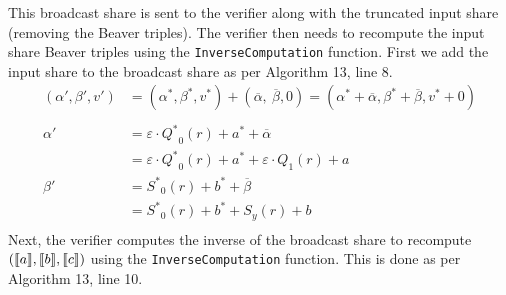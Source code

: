 \documentclass[11pt]{report}
\theoremstyle{definition}
\theoremstyle{plain}
\begin{document}
This broadcast share is sent to the verifier along with the truncated input share (removing the Beaver triples). The verifier then needs to recompute the input share Beaver triples using the \texttt{InverseComputation} function. First we add the input share to the broadcast share as per Algorithm 13, line 8.
\begin{align*}
  (\alpha', \beta', v') & = (\alpha^*, \beta^*, v^*) + (\overline{\alpha},\ \overline{\beta}, 0)
  = (\alpha^* + \overline{\alpha}, \beta^* + \overline{\beta}, v^* + 0)                          \\\\
  \alpha'               & = \varepsilon \cdot {Q^*}_0(r) + a^* + \overline{\alpha}               \\
                        & = \varepsilon \cdot {Q^*}_0(r) + a^* + \varepsilon \cdot Q_1(r) + a    \\
  \beta'                & = {S^*}_0(r) + b^* + \overline{\beta}                                  \\
                        & = {S^*}_0(r) + b^* + S_y(r) + b                                        \\
\end{align*}
Next, the verifier computes the inverse of the broadcast share to recompute $(\llbracket a \rrbracket, \llbracket b \rrbracket, \llbracket c \rrbracket)$ using the \texttt{InverseComputation} function. This is done as per Algorithm 13, line 10.
\end{document}
